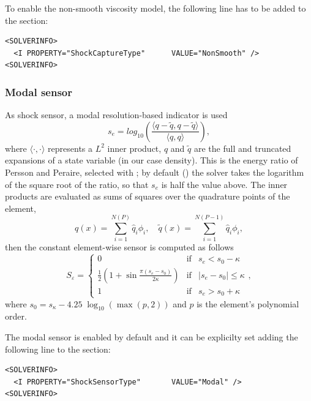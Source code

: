 To enable the non-smooth viscosity model, the following line has to be added to the  section:
\begin{lstlisting}[style=XmlStyle]
<SOLVERINFO>
  <I PROPERTY="ShockCaptureType"      VALUE="NonSmooth" />
<SOLVERINFO>
\end{lstlisting}

\subsubsection{Modal sensor}\label{subsec:modal-sensor}
As shock sensor, a modal resolution-based indicator is used
\begin{equation}\label{eq:sensor}
  s_e = log_{10}\left( \frac{\langle q - \tilde{q}, q - \tilde{q}  \rangle}{\langle q, q \rangle} \right) ,
\end{equation}
where $\langle \cdot, \cdot \rangle$ represents a $L^2$ inner product, $q$ and $\tilde{q}$ are the full and truncated expansions of a state variable (in our case density). This is the energy ratio of Persson and Peraire, selected with ; by default () the solver takes the logarithm of the square root of the ratio, so that $s_e$ is half the value above. The inner products are evaluated as sums of squares over the quadrature points of the element,
\begin{equation}
  q(x) = \sum_{i=1}^{N(P)} \hat{q}_i \phi_i , \quad \tilde{q}(x) = \sum_{i=1}^{N(P-1)} \hat{q}_i \phi_i ,
\end{equation}
then the constant element-wise sensor is computed as follows
\begin{equation}
   S_\varepsilon
=  \left \{ \begin{array}{lll}
    0 &	 \mbox{if} & s_e<s_0-\kappa \\
    \frac{1}{2}\left(1+\sin{\frac{\pi\left(s_e-s_0\right)}{2\kappa}}\right) &	\mbox{if} &	| s_e - s_0| \le \kappa\\
    1 &	 \mbox{if} & s_e > s_0+\kappa
      \end{array}
    \right.,
\end{equation}
where $s_0 = s_\kappa - 4.25\;\log_{10}(\max(p,2))$ and $p$ is the element's polynomial order.

The modal sensor is enabled by default and it can be explicilty set adding the following line to the  section:
\begin{lstlisting}[style=XmlStyle]
<SOLVERINFO>
  <I PROPERTY="ShockSensorType"       VALUE="Modal" />
<SOLVERINFO>
\end{lstlisting}

